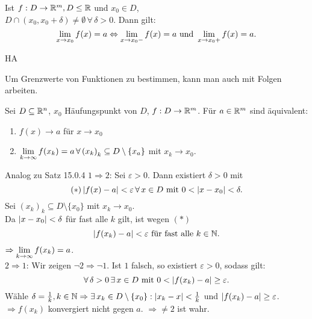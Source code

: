 \documentclass[../ana1.tex]{subfiles}
\begin{document}
\begin{bem}
    Ist \( f: D \rightarrow \mathbb{R}^m, D \leq \mathbb{R} \) und \( x_0 \in D \),\\
    \( D \cap (x_0, x_0 + \delta) \neq \emptyset \,\forall \, 
    \delta > 0 \). Dann gilt: 
    \[ \lim\limits_{x\rightarrow x_0} f(x) = a \Leftrightarrow
    \lim\limits_{x\rightarrow x_0-} f(x) = a \text{ und } \lim\limits_{x\rightarrow x_0+} 
    f(x) = a. \]
\end{bem}
\begin{bew}
    HA
\end{bew}
Um Grenzwerte von Funktionen zu bestimmen, kann man auch 
mit Folgen arbeiten.
\begin{satz}
    Sei \( D \subseteq \mathbb{R}^n \), \(x_0 \) Häufungspunkt von 
    \( D \), \( f: D \rightarrow \mathbb{R}^m \). Für \( a\in \mathbb{R}^m \) 
    sind äquivalent:
    \begin{enumerate}
        \item \( f(x) \rightarrow a \) für \( x\rightarrow x_0 \)
        \item \( \lim\limits_{k\rightarrow\infty} f(x_k) = a \,\forall \, {(x_k)}_k 
        \subseteq D \setminus \{x_a\} \) mit \( x_k \rightarrow x_0 \).
    \end{enumerate}
\end{satz}
\begin{bew}
    Analog zu Satz 15.0.4
    \( 1 \Rightarrow 2 \): Sei \( \varepsilon > 0 \). Dann 
    existiert \( \delta > 0 \) mit 
    \[ (*) \left|f(x) - a\right| < \varepsilon \,\forall \, x\in D 
    \text{ mit } 0 < \left|x-x_0\right| < \delta. \]
    Sei \( {(x_k)}_k \subseteq D \setminus \{x_0\} \) mit 
    \( x_k \rightarrow x_0 \).\\
    Da \( \left|x-x_0\right| < \delta \) für fast alle \(k\) gilt, 
    ist wegen \( (*) \)
    \[ \left|f(x_k) - a\right| < \varepsilon \text{ für fast alle } k\in\mathbb{N}. \]
    \( \Rightarrow \lim\limits_{k\rightarrow\infty} f(x_k) = a \).\\
    \( 2 \Rightarrow 1\): Wir zeigen 
    \( \neg 2 \Rightarrow \neg 1\).
    Ist \( 1 \) falsch, so existiert \( \varepsilon > 0 \), sodass
    gilt: 
    \[ \forall \, \delta > 0 \,\exists \, x \in D \text{ mit } 0 < 
    \left|f(x_k) - a\right| \geq \varepsilon. \]
    Wähle \( \delta = \frac{1}{k}, k\in\mathbb{N} \Rightarrow \exists \, x_k 
    \in D\setminus \{ x_0 \} : \left|x_k - x\right| < \frac{1}{k} \) und 
    \( \left|f(x_k) - a\right| \geq \varepsilon \).\\
    \( \Rightarrow f(x_k) \) konvergiert nicht gegen \(a\). 
    \( \Rightarrow \neq 2 \) ist wahr.
\end{bew}
\end{document}
